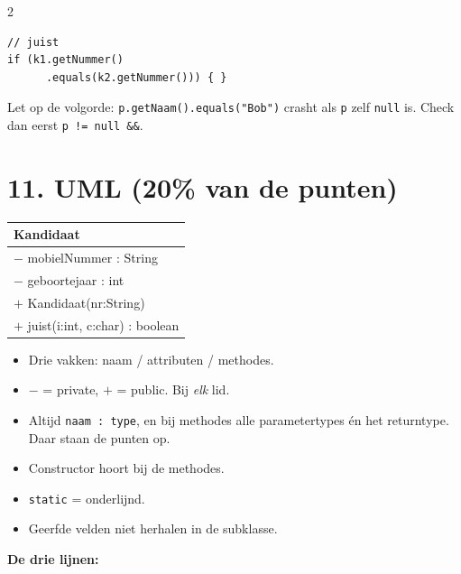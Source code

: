\documentclass[12pt,a4paper]{extarticle}
\begin{document}
\begin{multicols}{2}
\begin{lstlisting}
// juist
if (k1.getNummer()
      .equals(k2.getNummer())) { }
\end{lstlisting}
    Let op de volgorde: \texttt{p.getNaam().equals("Bob")} crasht als \texttt{p}
    zelf \texttt{null} is. Check dan eerst \texttt{p != null \&\&}.

    \section{11. UML (20\% van de punten)}
    \begin{center}
        \small
        \begin{tabular}{|l|}
            \hline
            \textbf{Kandidaat}                 \\ \hline
            $-$ mobielNummer : String          \\
            $-$ geboortejaar : int             \\ \hline
            $+$ Kandidaat(nr:String)           \\
            $+$ juist(i:int, c:char) : boolean \\ \hline
        \end{tabular}
    \end{center}
    \begin{itemize}
        \item Drie vakken: naam / attributen / methodes.
        \item $-$ = private, $+$ = public. Bij \emph{elk} lid.
        \item Altijd \texttt{naam : type}, en bij methodes alle parametertypes \'en het
              returntype. Daar staan de punten op.
        \item Constructor hoort bij de methodes.
        \item \texttt{static} = onderlijnd.
        \item Geerfde velden niet herhalen in de subklasse.
    \end{itemize}

    \textbf{De drie lijnen:}

    \begin{center}
\end{center}
\end{multicols}
\end{document}
